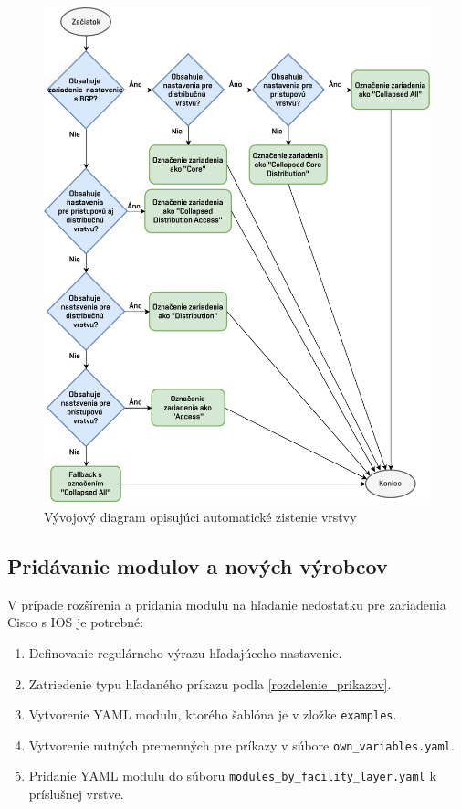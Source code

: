 \begin{figure}[H]
	\begin{center}
		\vspace*{-1cm}\includegraphics[scale=0.8]{obrazky/fac_layer.pdf}
	\end{center}
	\caption[Vývojový diagram opisujúci automatické zistenie vrstvy]{Vývojový diagram opisujúci automatické zistenie vrstvy}
	\label{fac_layer}
\end{figure}


\subsection{Pridávanie modulov a nových výrobcov}
V prípade rozšírenia a pridania modulu na hľadanie nedostatku pre zariadenia Cisco s IOS je potrebné:
\begin{enumerate}
	\item Definovanie regulárneho výrazu hľadajúceho nastavenie.
	\item Zatriedenie typu hľadaného príkazu podľa \ref{rozdelenie_prikazov}.
	\item Vytvorenie YAML modulu, ktorého šablóna je v zložke \texttt{examples}.
	\item Vytvorenie nutných premenných pre príkazy v súbore \texttt{own\_variables.yaml}.
	\item Pridanie YAML modulu do súboru \texttt{modules\_by\_facility\_layer.yaml} k príslušnej vrstve.
\end{enumerate}

